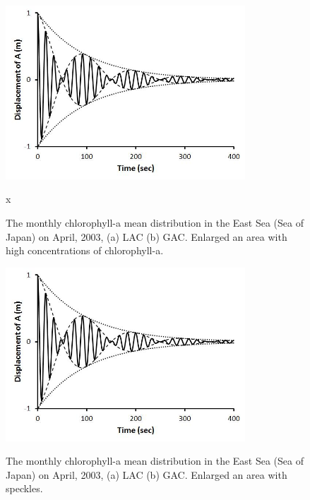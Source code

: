   \begin{figure}[h]
  	\centering
  	\includegraphics[width=0.8\textwidth]{../images/monHISHI}\\
  	\scriptsize\caption{The monthly chlorophyll-a mean distribution in the East Sea (Sea of Japan) on April, 2003, (a) LAC (b) GAC. Enlarged an area with high concentrations of chlorophyll-a.}
  	\label{fig:monHISHI}x
  \end{figure}
  
    \begin{figure}[h]
  	\centering
  	\includegraphics[width=0.8\textwidth]{../images/monHISSPEC}\\
  	\scriptsize\caption{The monthly chlorophyll-a mean distribution in the East Sea (Sea of Japan) on April, 2003, (a) LAC (b) GAC. Enlarged an area with speckles.}
  	\label{fig:monHISSPEC}
  \end{figure}
